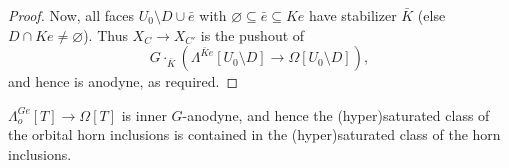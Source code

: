 \documentclass[a4paper,10p,draft]{article}%
\numberwithin{equation}{section}%
\begin{document}
\begin{proof}
      Now, all faces $U_0 \setminus D \cup \bar e$ with $\varnothing \subseteq \bar e \subseteq K e$ have stabilizer $\bar K$
      (else $D \cap K e \neq \varnothing$).
      Thus $X_C \to X_{C'}$ is the pushout of
      \begin{equation}
            \label{CHAR_HORN_EQ}
            G \cdot_{\bar K} \left( \Lambda^{\bar K e}[U_0 \setminus D] \to \Omega[U_0 \setminus D] \right),
      \end{equation}
      and hence is anodyne, as required.
\end{proof}



\begin{proposition}
      \label{ORB_HORN_PROP}
      $\Lambda_o^{Ge}[T] \to \Omega[T]$ is inner $G$-anodyne, and hence
      the (hyper)saturated class of the orbital horn inclusions is contained in
      the (hyper)saturated class of the horn inclusions.
\end{proposition}
\end{document}
